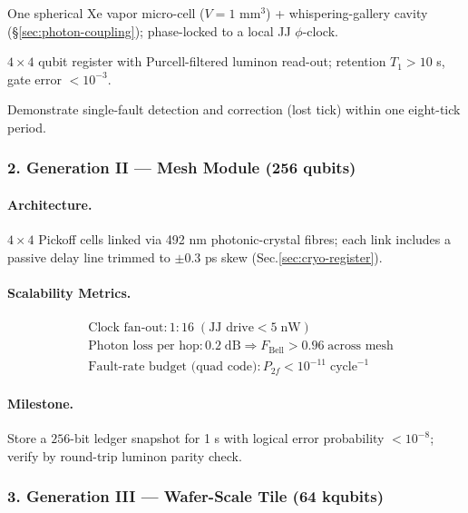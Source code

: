 \documentclass[11pt,oneside]{book}
\begin{document}
\begin{description}[leftmargin=1.6cm, style=nextline]
\item[Hardware.] One spherical Xe vapor micro-cell ($V=1$ mm$^{3}$) +
      whispering-gallery cavity (\S\;\ref{sec:photon-coupling});  
      phase-locked to a local JJ $\phi$-clock.
\item[Capacity.] $4\times4$ qubit register with Purcell-filtered
      luminon read-out; retention $T_{1} > 10$ s, gate error
      $<10^{-3}$.
\item[Milestone.] Demonstrate single-fault detection and correction
      (lost tick) within one eight-tick period.
\end{description}

\subsubsection*{2. Generation II — Mesh Module (256 qubits)}

\paragraph{Architecture.}
$4\times4$ Pickoff cells linked via
492 nm photonic-crystal fibres;  
each link includes a passive delay line trimmed to  
$\pm0.3$ ps skew (Sec.\;\ref{sec:cryo-register}).

\paragraph{Scalability Metrics.}
\vspace{-4pt}
\[
\begin{aligned}
&\text{Clock fan-out}: 1:16\;(\text{JJ drive} <5\;\text{nW})\\
&\text{Photon loss per hop}: 0.2\;\text{dB} \Rightarrow
  F_{\mathrm{Bell}}>0.96\;\text{across mesh} \\
&\text{Fault-rate budget (quad code)}:
  P_{2f}<10^{-11}\;\text{cycle}^{-1}
\end{aligned}
\]

\paragraph{Milestone.}
Store a \(256\)-bit ledger snapshot for 1 s with logical error probability
$<10^{-8}$; verify by round-trip luminon parity check.

\subsubsection*{3. Generation III — Wafer-Scale Tile (64 kqubits)}
\end{document}
